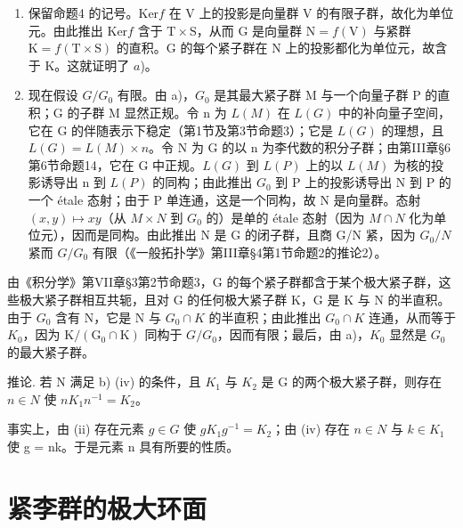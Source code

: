 \begin{enumerate}
\def\labelenumi{\alph{enumi})}
\item
  保留命题4 的记号。\(\mathrm{Ker}f\) 在 V 上的投影是向量群 V 的有限子群，故化为单位元。由此推出 \(\mathrm{Ker}f\) 含于 \(\mathrm{T} \times \mathrm{S}\)，从而 G 是向量群 \(\mathrm{N} = f(\mathrm{V})\) 与紧群 \(\mathrm{K} = f(\mathrm{T} \times \mathrm{S})\) 的直积。G 的每个紧子群在 N 上的投影都化为单位元，故含于 K。这就证明了 \(a\))。
\item
  现在假设 \(G/G_{0}\) 有限。由 a)，\(G_{0}\) 是其最大紧子群 M 与一个向量子群 P 的直积；G 的子群 M 显然正规。令 n 为 \(L(M)\) 在 \(L(G)\) 中的补向量子空间，它在 G 的伴随表示下稳定（第1节及第3节命题3）；它是 \(L(G)\) 的理想，且 \(L(G) = L(M) \times n\)。令 N 为 G 的以 n 为李代数的积分子群；由第III章§6第6节命题14，它在 G 中正规。\(L(G)\) 到 \(L(P)\) 上的以 \(L(M)\) 为核的投影诱导出 n 到 \(L(P)\) 的同构；由此推出 \(G_{0}\) 到 P 上的投影诱导出 N 到 P 的一个 étale 态射；由于 P 单连通，这是一个同构，故 N 是向量群。态射 \((x, y) \mapsto xy\)（从 \(M \times N\) 到 \(G_{0}\) 的）是单的 étale 态射（因为 \(M \cap N\) 化为单位元），因而是同构。由此推出 N 是 G 的闭子群，且商 G/N 紧，因为 \(G_{0}/N\) 紧而 \(G/G_{0}\) 有限（《一般拓扑学》第III章§4第1节命题2的推论2）。
\end{enumerate}

由《积分学》第VII章§3第2节命题3，G 的每个紧子群都含于某个极大紧子群，这些极大紧子群相互共轭，且对 G 的任何极大紧子群 K，G 是 K 与 N 的半直积。由于 \(G_{0}\) 含有 N，它是 N 与 \(G_{0} \cap K\) 的半直积；由此推出 \(G_{0} \cap K\) 连通，从而等于 \(K_{0}\)，因为 \(\mathrm{K}/(\mathrm{G}_{0} \cap \mathrm{K})\) 同构于 \(G/G_{0}\)，因而有限；最后，由 a)，\(K_{0}\) 显然是 \(G_{0}\) 的最大紧子群。

推论. 若 N 满足 b) (iv) 的条件，且 \(K_{1}\) 与 \(K_{2}\) 是 G 的两个极大紧子群，则存在 \(n \in N\) 使 \(nK_{1}n^{-1} = K_{2}\)。

事实上，由 (ii) 存在元素 \(g \in G\) 使 \(gK_{1}g^{-1} = K_{2}\)；由 (iv) 存在 \(n \in N\) 与 \(k \in K_{1}\) 使 g = nk。于是元素 n 具有所要的性质。

\section{紧李群的极大环面}